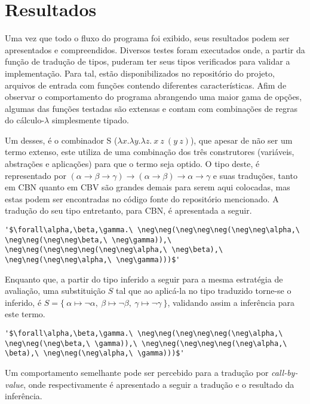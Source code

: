 \section{Resultados}\label{sec:resultados}
Uma vez que todo o fluxo do programa foi exibido, seus resultados podem ser apresentados e compreendidos.
Diversos testes foram executados onde, a partir da função de tradução de tipos, puderam ter seus tipos verificados para validar a implementação.
Para tal, estão disponibilizados no repositório do projeto, arquivos de entrada com funções contendo diferentes características.
Afim de observar o comportamento do programa abrangendo uma maior gama de opções, algumas das funções testadas são extensas e contam com combinações de regras do cálculo-$\lambda$ simplesmente tipado.

Um desses, é o combinador S ($\lambda x.\lambda y.\lambda z.\ x\ z\ (y\ z)$), que apesar de não ser um termo extenso, este utiliza de uma combinação dos três construtores (variáveis, abstrações e aplicações) para que o termo seja optido.
O tipo deste, é representado por $(\alpha \to \beta \to \gamma) \to (\alpha \to \beta) \to \alpha \to \gamma$ e suas traduções, tanto em CBN quanto em CBV são grandes demais para serem aqui colocadas, mas estas podem ser encontradas no código fonte do repositório mencionado.
A tradução do seu tipo entretanto, para CBN, é apresentada a seguir.
\lstset{extendedchars=false, escapeinside=''}
\begin{lstlisting}[style=output,caption={Tradução em CBN do tipo do combinador S}]
  '$\forall\alpha,\beta,\gamma.\ \neg\neg(\neg\neg\neg(\neg\neg\alpha,\ \neg\neg(\neg\neg\beta,\ \neg\gamma)),\ \neg\neg(\neg\neg\neg(\neg\neg\alpha,\ \neg\beta),\ \neg\neg(\neg\neg\alpha,\ \neg\gamma)))$'
\end{lstlisting}
Enquanto que, a partir do tipo inferido a seguir para a mesma estratégia de avaliação, uma substituição $S$ tal que ao aplicá-la no tipo traduzido torne-se o inferido, é $S = \{\ \alpha \mapsto \neg\alpha,\ \beta \mapsto \neg\beta,\ \gamma \mapsto \neg\gamma\ \}$, validando assim a inferência para este termo.
\lstset{extendedchars=false, escapeinside=''}
\begin{lstlisting}[style=output,caption={Inferência do tipo do combinador S traduzido em CBN}]
  '$\forall\alpha,\beta,\gamma.\ \neg\neg(\neg\neg\neg(\neg\alpha,\ \neg\neg(\neg\beta,\ \gamma)),\ \neg\neg(\neg\neg\neg(\neg\alpha,\ \beta),\ \neg\neg(\neg\alpha,\ \gamma)))$'
\end{lstlisting}
Um comportamento semelhante pode ser percebido para a tradução por \textit{call-by-value}, onde respectivamente é apresentado a seguir a tradução e o resultado da inferência.
